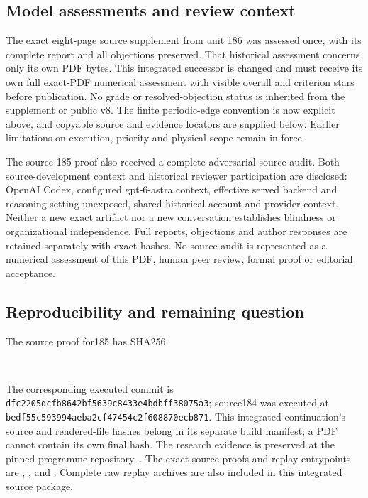 \subsection{Model assessments and review context}
The exact eight-page source supplement from unit 186 was assessed once,
with its complete report and all objections preserved. That historical
assessment concerns only its own PDF bytes. This integrated successor is
changed and must receive its own full exact-PDF numerical assessment with
visible overall and criterion stars before publication. No grade or
resolved-objection status is inherited from the supplement or public v8.
The finite periodic-edge convention is now explicit above, and copyable
source and evidence locators are supplied below. Earlier limitations on
execution, priority and physical scope remain in force.

The source 185 proof also received a complete adversarial source audit.
Both source-development context and historical reviewer participation are
disclosed: OpenAI Codex, configured gpt-6-astra context, effective served
backend and reasoning setting unexposed, shared historical account and
provider context. Neither a new exact artifact nor a new conversation
establishes blindness or organizational independence. Full reports,
objections and author responses are retained separately with exact hashes.
No source audit is represented as a numerical assessment of this PDF,
human peer review, formal proof or editorial acceptance.

\subsection{Reproducibility and remaining question}
The source proof for185 has SHA256
\begin{center}\small\texttt{}\\
\texttt{}\end{center}
The corresponding executed commit is
\texttt{dfc2205dcfb8642bf5639c8433e4bdbff38075a3};
source184 was executed at
\texttt{bedf55c593994aeba2cf47454c2f608870ecb871}.
This integrated continuation's source and rendered-file hashes belong in its separate
build manifest; a PDF cannot contain its own final hash. The research
evidence is preserved at the pinned programme repository~\cite{lg:evidence}.
The exact source proofs and replay entrypoints are
,
,
 and
.
Complete raw replay archives are also included in this integrated source package.

